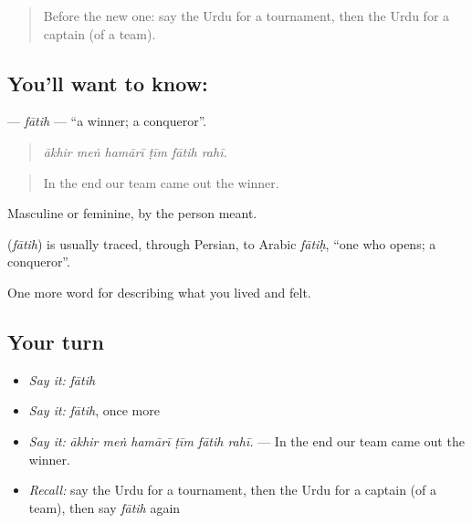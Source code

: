 \begin{quote}
Before the new one: say the Urdu for a tournament, then the Urdu for a captain (of a team).
\end{quote}

\subsection*{You'll want to know: }
\textbf{} — \emph{fātih} — \textquotedblleft{}a winner; a conqueror\textquotedblright{}.

\begin{quote}
     
\end{quote}

\begin{quote}
\emph{ākhir meṅ hamārī ṭīm fātih rahī.}
\end{quote}

\begin{quote}
In the end our team came out the winner.
\end{quote}

Masculine or feminine, by the person meant.

\begin{cousinweb}
\textbf{} (\emph{fātih}) is usually traced, through Persian, to Arabic \emph{fātiḥ}, \textquotedblleft{}one who opens; a conqueror\textquotedblright{}.
\end{cousinweb}

\begin{grammarlens}[title={What you've built}]
One more word for describing what you lived and felt.
\end{grammarlens}

\subsection*{Your turn}
\begin{itemize}
\raggedright
  \item \emph{Say it:} \emph{fātih}
  \item \emph{Say it:} \emph{fātih}, once more
  \item \emph{Say it:} \emph{ākhir meṅ hamārī ṭīm fātih rahī.} — In the end our team came out the winner.
  \item \emph{Recall:} say the Urdu for a tournament, then the Urdu for a captain (of a team), then say \emph{fātih} again
\end{itemize}


